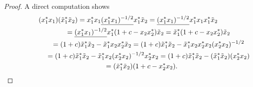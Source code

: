 \begin{proof}A direct computation shows
\begin{gather*}
( x_{1}^{\ast}x_{1}) ( \tilde{x}_{1}^{\ast}\tilde{x}_{2}) =x_{1}^{\ast}x_{1}\underline{( x_{1}^{\ast}x_{1})
^{-1/2}}x_{1}^{\ast}\tilde{x}_{2}=\underline{( x_{1}^{\ast}x_{1})
^{-1/2}}x_{1}^{\ast}x_{1}x_{1}^{\ast}\tilde{x}_{2}%
\\
\hphantom{( x_{1}^{\ast}x_{1}) ( \tilde{x}_{1}^{\ast}\tilde{x}_{2})}{}
=\underline{( x_{1}^{\ast}x_{1}) ^{-1/2}}x_{1}^{\ast}(
1+c-x_{2}x_{2}^{\ast}) \tilde{x}_{2}=\tilde{x}_{1}^{\ast}(
1+c-x_{2}x_{2}^{\ast}) \tilde{x}_{2}\\
\hphantom{( x_{1}^{\ast}x_{1}) ( \tilde{x}_{1}^{\ast}\tilde{x}_{2})}{}
=( 1+c) \tilde{x}%
_{1}^{\ast}\tilde{x}_{2}-\tilde{x}_{1}^{\ast}x_{2}x_{2}^{\ast}\tilde{x}_{2}
=( 1+c) \tilde{x}_{1}^{\ast}\tilde{x}_{2}-\tilde{x}_{1}^{\ast
}x_{2}x_{2}^{\ast}x_{2}( x_{2}^{\ast}x_{2}) ^{-1/2}\\
\hphantom{( x_{1}^{\ast}x_{1}) ( \tilde{x}_{1}^{\ast}\tilde{x}_{2})}{}
=(1+c) \tilde{x}_{1}^{\ast}\tilde{x}_{2}-\tilde{x}_{1}^{\ast}x_{2}(
x_{2}^{\ast}x_{2}) ^{-1/2}x_{2}^{\ast}x_{2}
=( 1+c) \tilde{x}_{1}^{\ast}\tilde{x}_{2}-( \tilde{x}%
_{1}^{\ast}\tilde{x}_{2}) ( x_{2}^{\ast}x_{2}) \\
\hphantom{( x_{1}^{\ast}x_{1}) ( \tilde{x}_{1}^{\ast}\tilde{x}_{2})}{}
=(\tilde{x}_{1}^{\ast}\tilde{x}_{2}) ( 1+c-x_{2}^{\ast}x_{2}) .\tag*{\qed}
\end{gather*}
\renewcommand{\qed}{}
\end{proof}

